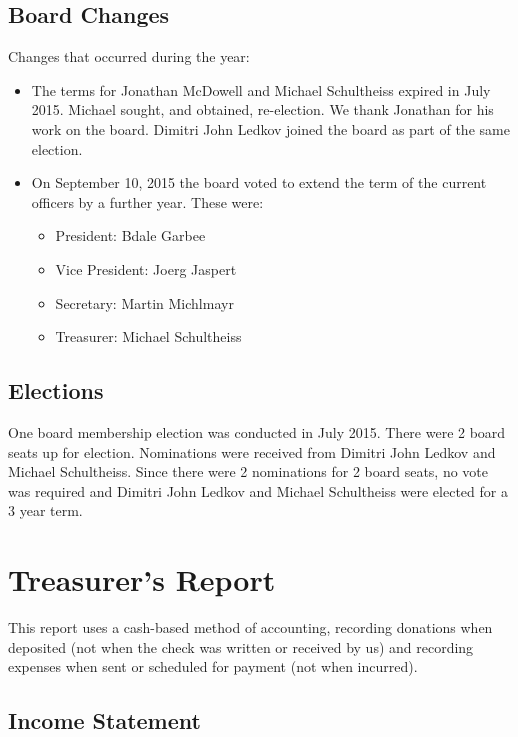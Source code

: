 \documentclass[letterpaper]{report}
\begin{document}
\section{Board Changes}

Changes that occurred during the year:

\begin{itemize} \item The terms for Jonathan McDowell and Michael
Schultheiss expired in July 2015.  Michael sought, and obtained,
re-election.  We thank Jonathan for his work on the board.  Dimitri John
Ledkov joined the board as part of the same election.

\item On September 10, 2015 the board voted to extend the term of the
current officers by a further year. These were:
\begin{itemize}
\item President: Bdale Garbee
\item Vice President: Joerg Jaspert
\item Secretary: Martin Michlmayr
\item Treasurer: Michael Schultheiss
\end{itemize}
\end{itemize}

\section{Elections}

One board membership election was conducted in July 2015.  There were 2
board seats up for election.  Nominations were received from Dimitri
John Ledkov and Michael Schultheiss.  Since there were 2 nominations for
2 board seats, no vote was required and Dimitri John Ledkov and Michael
Schultheiss were elected for a 3 year term.

\chapter{Treasurer's Report}

This report uses a cash-based method of accounting, recording donations when
deposited (not when the check was written or received by us) and recording
expenses when sent or scheduled for payment (not when incurred).

\section{Income Statement}
\end{document}
